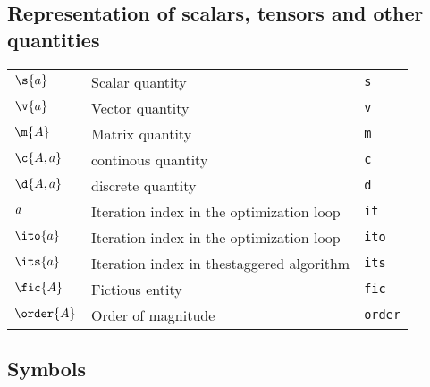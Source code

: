 \subsection*{Representation of scalars, tensors and other quantities}
\begin{tabular}{l l l}
$\s{a}$ & Scalar quantity& \texttt{s}\\
$\v{a}$ & Vector quantity& \texttt{v}\\
$\m{A}$ & Matrix quantity& \texttt{m}\\
$\c{A,a}$ & continous quantity& \texttt{c}\\
$\d{A,a}$ & discrete quantity& \texttt{d}\\
$\it{a}$ & Iteration index in the optimization loop& \texttt{it}\\
$\ito{a}$ & Iteration index in the optimization loop& \texttt{ito}\\
$\its{a}$ & Iteration index in thestaggered algorithm& \texttt{its}\\
$\fic{A}$ & Fictious entity& \texttt{fic}\\
$\order{A}$ & Order of magnitude& \texttt{order}\\
\end{tabular}

\subsection*{Symbols}

